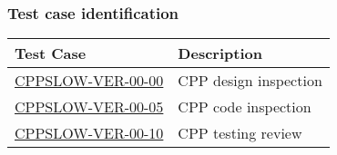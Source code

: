 \subsubsection{Test case identification}
\phantom{ } %
\begin{longtable} {|p{}|p{}|}\hline
\textbf{Test Case}  & \textbf{Description} \\\hline
\hyperref[cppslow-ver-00-00]{CPPSLOW-VER-00-00} & CPP design inspection \\\hline
\hyperref[cppslow-ver-00-05]{CPPSLOW-VER-00-05} & CPP code inspection \\\hline
\hyperref[cppslow-ver-00-10]{CPPSLOW-VER-00-10} & CPP testing review \\\hline
\end{longtable}
